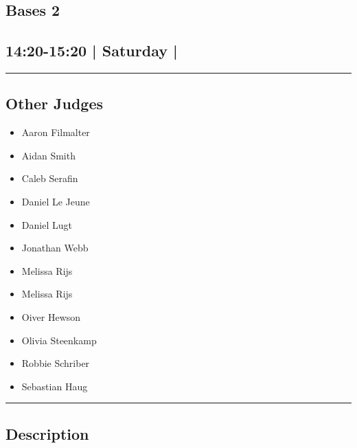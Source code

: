 \documentclass[10pt, A5]{article}
\begin{document}
		\begin{framed}
			\begin{minipage}{\textwidth}

			\setcounter{section}{45}
							\section{Bases 2}
						
			\subsection*{14:20-15:20 | Saturday | }

			\vspace{0.25cm}
			\hrule
			\vspace{0.25cm}


			\subsection*{Other Judges}
							

				\begin{multicols}{2}

			\begin{itemize}
											\item Aaron Filmalter
											\item Aidan Smith
											\item Caleb Serafin
											\item Daniel Le Jeune
											\item Daniel Lugt
											\item Jonathan Webb
											\item Melissa Rijs
								\end{itemize}

			\vfill\null
			\columnbreak

			\begin{itemize}
											\item Melissa Rijs
											\item Oiver Hewson
											\item Olivia Steenkamp
											\item Robbie Schriber
											\item Sebastian Haug
								\end{itemize}

			\vfill\null

			\end{multicols}

			\vspace{0.25cm}
			\hrule
			\vspace{0.25cm}

			\begin{minipage}{\textwidth}
			\subsection*{\faListAlt \: Description}
			
			\end{minipage}


	\end{minipage}
	\end{framed}
\end{document}
